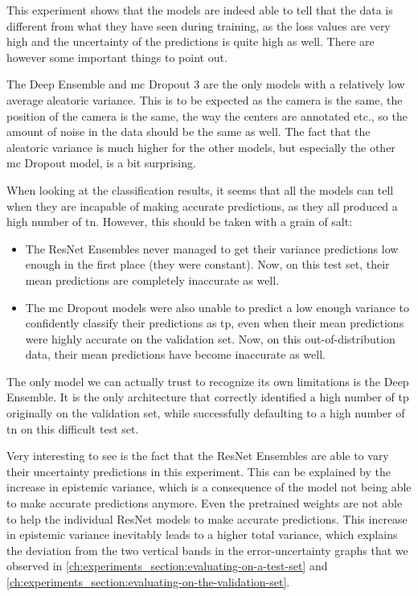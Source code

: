 This experiment shows that the models are indeed able to tell that the data is different from what they have seen during training, as the loss values are very high and the uncertainty of the predictions is quite high as well.
There are however some important things to point out.

The Deep Ensemble and \gls{mc} Dropout 3 are the only models with a relatively low average aleatoric variance.
This is to be expected as the camera is the same, the position of the camera is the same, the way the centers are annotated etc., so the amount of noise in the data should be the same as well.
The fact that the aleatoric variance is much higher for the other models, but especially the other \gls{mc} Dropout model, is a bit surprising.

When looking at the classification results, it seems that all the models can tell when they are incapable of making accurate predictions, as they all produced a high number of \gls{tn}.
However, this should be taken with a grain of salt:
\begin{itemize}
    \item The ResNet Ensembles never managed to get their variance predictions low enough in the first place (they were constant). Now, on this test set, their mean predictions are completely inaccurate as well.
    \item The \gls{mc} Dropout models were also unable to predict a low enough variance to confidently classify their predictions as \gls{tp}, even when their mean predictions were highly accurate on the validation set. Now, on this out-of-distribution data, their mean predictions have become inaccurate as well.
\end{itemize}
The only model we can actually trust to recognize its own limitations is the Deep Ensemble. It is the only architecture that correctly identified a high number of \gls{tp} originally on the validation set, while successfully defaulting to a high number of \gls{tn} on this difficult test set.

Very interesting to see is the fact that the ResNet Ensembles are able to vary their uncertainty predictions in this experiment.
This can be explained by the increase in epistemic variance, which is a consequence of the model not being able to make accurate predictions anymore.
Even the pretrained weights are not able to help the individual ResNet models to make accurate predictions.
This increase in epistemic variance inevitably leads to a higher total variance, which explains the deviation from the two vertical bands in the error-uncertainty graphs that we observed in \cref{ch:experiments_section:evaluating-on-a-test-set} and \cref{ch:experiments_section:evaluating-on-the-validation-set}.


